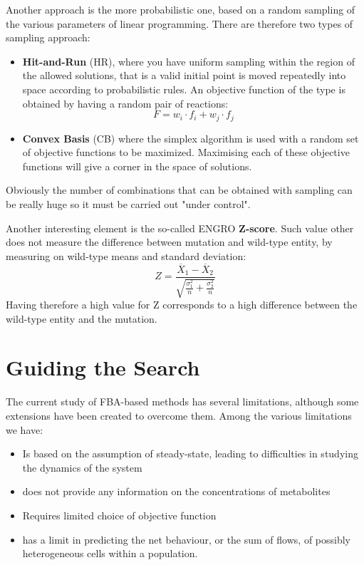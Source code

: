Another approach is the more probabilistic one, based on a random sampling of the various 
parameters of linear programming. There are therefore two types of sampling approach:
\begin{itemize}
    \item \textbf{Hit-and-Run} (HR), where you have uniform sampling within the region of the
        allowed solutions, that is a valid initial point is moved repeatedly into space
        according to probabilistic rules. An objective function of the type is obtained by
        having a random pair of reactions:
        \begin{equation*}
            F = w_i \cdot f_i + w_j \cdot f_j
        \end{equation*}
    \item \textbf{Convex Basis} (CB) where the simplex algorithm is used with a random set of
        objective functions to be maximized. Maximising each of these objective functions will
        give a corner in the space of solutions.
\end{itemize}
Obviously the number of combinations that can be obtained with sampling can be really huge so
it must be carried out "under control".

Another interesting element is the so-called ENGRO \textbf{Z-score}. Such value other does not
measure the difference between mutation and wild-type entity, by measuring on wild-type means
and standard deviation:
\begin{equation}
    Z = \frac{\overline{X}_1 - \overline{X}_2}{\sqrt{\frac{\sigma^2_1}{n} + \frac{\sigma^2_2}{n}}}
\end{equation}
Having therefore a high value for Z corresponds to a high difference between the wild-type 
entity and the mutation.
\section{Guiding the Search}
The current study of FBA-based methods has several limitations, although some extensions have 
been created to overcome them. Among the various limitations we have:
\begin{itemize}
    \item Is based on the assumption of steady-state, leading to difficulties in studying the
        dynamics of the system
    \item does not provide any information on the concentrations of metabolites
    \item Requires limited choice of objective function
    \item has a limit in predicting the net behaviour, or the sum of flows, of possibly 
        heterogeneous cells within a population.
\end{itemize} 

